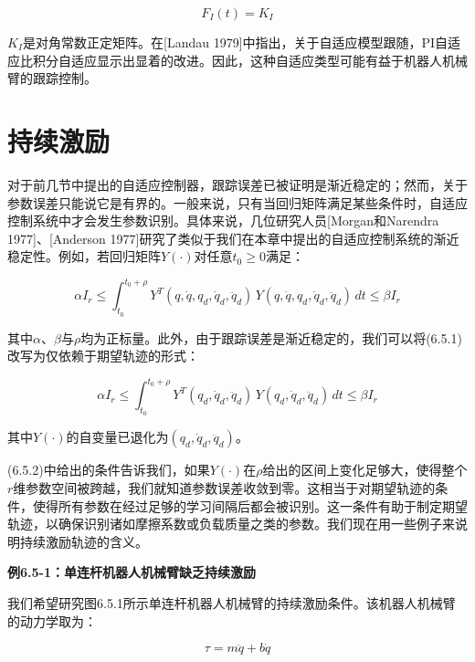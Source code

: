 \documentclass[12pt,a4paper]{ctexart}
\begin{document}
\begin{equation}\label{eq:6.4.21}
F_I(t) = K_I
\end{equation}

$K_I$是对角常数正定矩阵。在[Landau 1979]中指出，关于自适应模型跟随，PI自适应比积分自适应显示出显着的改进。因此，这种自适应类型可能有益于机器人机械臂的跟踪控制。

\section{持续激励}\label{sec:persistency}

对于前几节中提出的自适应控制器，跟踪误差已被证明是渐近稳定的；然而，关于参数误差只能说它是有界的。一般来说，只有当回归矩阵满足某些条件时，自适应控制系统中才会发生参数识别。具体来说，几位研究人员[Morgan和Narendra 1977]、[Anderson 1977]研究了类似于我们在本章中提出的自适应控制系统的渐近稳定性。例如，若回归矩阵$Y(\cdot)$对任意$t_0 \geq 0$满足：

\begin{equation}\label{eq:6.5.1}
\alpha I_r \leq \int_{t_0}^{t_0+\rho} Y^T(q, \dot{q}, q_d, \dot{q}_d, \ddot{q}_d)\, Y(q, \dot{q}, q_d, \dot{q}_d, \ddot{q}_d)\, dt \leq \beta I_r
\end{equation}

其中$\alpha$、$\beta$与$\rho$均为正标量。此外，由于跟踪误差是渐近稳定的，我们可以将(6.5.1)改写为仅依赖于期望轨迹的形式：

\begin{equation}\label{eq:6.5.2}
\alpha I_r \leq \int_{t_0}^{t_0+\rho} Y^T(q_d, \dot{q}_d, \ddot{q}_d)\, Y(q_d, \dot{q}_d, \ddot{q}_d)\, dt \leq \beta I_r
\end{equation}

其中$Y(\cdot)$的自变量已退化为$(q_d,\dot{q}_d,\ddot{q}_d)$。

(6.5.2)中给出的条件告诉我们，如果$Y(\cdot)$在$\rho$给出的区间上变化足够大，使得整个$r$维参数空间被跨越，我们就知道参数误差收敛到零。这相当于对期望轨迹的条件，使得所有参数在经过足够的学习间隔后都会被识别。这一条件有助于制定期望轨迹，以确保识别诸如摩擦系数或负载质量之类的参数。我们现在用一些例子来说明持续激励轨迹的含义。

\textbf{例6.5-1：单连杆机器人机械臂缺乏持续激励}

我们希望研究图6.5.1所示单连杆机器人机械臂的持续激励条件。该机器人机械臂的动力学取为：

\begin{equation}\tag{1}
\tau = m\ddot{q} + b\dot{q}
\end{equation}
\end{document}
